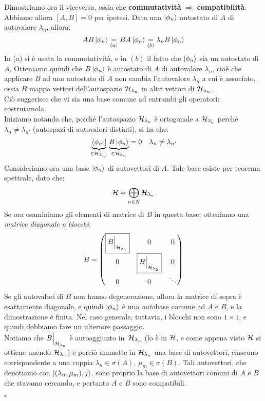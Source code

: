 \documentclass[../../FisicaTeorica.tex]{subfiles}
\begin{document}
Dimostriamo ora il viceversa, ossia che \textbf{commutatività} $\Rightarrow$ \textbf{compatibilità}.\\
Abbiamo allora $[A,B]=0$ per ipotesi. Data una $\Ket{\phi_n}$ autostato di $A$ di autovalore $\lambda_n$, allora:
\[
AB\Ket{\phi_n}\underset{(a)}{=}BA\Ket{\phi_n} \underset{(b)}{=} \lambda_n B\Ket{\phi_n}
\]
In (a) si è usata la commutatività, e in $(b)$ il fatto che $\Ket{\phi_n}$ sia un autostato di $A$. Otteniamo quindi che $B\Ket{\phi_n}$ è autostato di $A$ di autovalore $\lambda_n$, cioè che applicare $B$ ad uno autostato di $A$ non cambia l'autovalore $\lambda_n$ a cui è associato, ossia $B$ mappa vettori dell'autospazio $\mathcal{H}_{\lambda_n}$ in altri vettori di $\mathcal{H}_{\lambda_n}$.\\
Ciò suggerisce che vi sia una base comune ad entrambi gli operatori: costruiamola.\\
Iniziamo notando che, poiché l'autospazio $\mathcal{H}_{\lambda_n}$ è ortogonale a $\mathcal{H}_{\lambda_n'}$ perché $\lambda_n\neq \lambda_{n'}$ (autospazi di autovalori distinti), si ha che:
\[
\underbrace{\Bra{\phi_{n'}}}_{\in \mathcal{H}_{\lambda_{n'}}}\underbrace{B \Ket{\phi_n}}_{\in \mathcal{H}_{\lambda_n}}=0 \quad \lambda_n \neq \lambda_{n'}
\]
Consideriamo ora una base $\Ket{\phi_n}$ di autovettori di $A$. Tale base esiste per teorema spettrale, dato che:
\[
\mathcal{H}=\bigoplus_{n\in N} \mathcal{H}_{\lambda_n}
\]
Se ora esaminiamo gli elementi di matrice di $B$ in questa base, otteniamo una \textit{matrice diagonale a blocchi}:
\[
B=\begin{pmatrix}
\boxed{B\Big|_{\mathcal{H}_{\lambda_1}}} & 0 & 0\\
0 & \boxed{B\Big|_{\mathcal{H}_{\lambda_2}}} & 0\\
0 & 0 & \ddots
\end{pmatrix}
\]
Se gli autovalori di $B$ non hanno degenerazione, allora la matrice di sopra è esattamente diagonale, e quindi $\Ket{\phi_n}$ è una \textit{auto}base comune ad $A$ e $B$, e la dimostrazione è finita. Nel caso generale, tuttavia, i blocchi non sono $1\times 1$, e quindi dobbiamo fare un ulteriore passaggio.\\
Notiamo che $B\Big|_{\mathcal{H}_{\lambda_n}}$ è autoaggiunto in\ $\mathcal{H}_{\lambda_n}$ (lo è in $\mathcal{H}$, e come appena visto $\mathcal{H}$ si ottiene unendo $\mathcal{H}_{\lambda_n}$) e perciò ammette in $\mathcal{H}_{\lambda_n}$ una base di autovettori, ciascuno corrispondente a una coppia $\lambda_n \in \sigma(A)$, $\mu_m \in \sigma(B)$. Tali autovettori, che denotiamo con $\Ket{(\lambda_n, \mu_m), j}$, sono proprio la base di autovettori comuni di $A$ e $B$ che stavamo cercando, e pertanto $A$ e $B$ sono compatibili.
\begin{flushright}
$\square$
\end{flushright}
\end{document}
